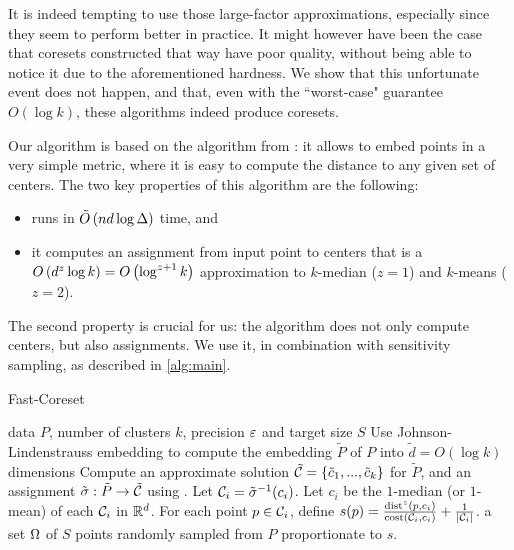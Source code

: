 It is indeed tempting to use those large-factor approximations, especially since they seem to perform better in practice. 
It might however have been the case that coresets constructed that way have poor quality, without being able to notice it due to the aforementioned hardness. 
We show that this unfortunate event does not happen, and that, even with the ``worst-case" guarantee $O(\log k)$, these algorithms indeed produce coresets.

Our algorithm is based on the \fkmeans algorithm from \cite{cohen2020fast}: it allows to embed points in a very simple metric,  where it is easy to compute the
distance to any given set of centers. The two key properties of this algorithm are the following: 
\begin{itemize}
\item \fkmeans runs in $\tilde O\left( n d \log \Delta\right)$ time, and
\item it computes an assignment from input point to centers that is a $O\left( d^z \log k\right) = O\left(\log^{z+1} k\right)$ approximation to $k$-median ($z=1$) and
$k$-means ($z=2$).
\end{itemize}

The second property is crucial for us: the algorithm does not only compute centers, but also assignments. 
  We use it, in combination with sensitivity sampling, as described in \cref{alg:main}.


\begin{algorithm}[tb]
   \caption{Fast-Coreset}
   \label{alg:main}
\begin{algorithmic}
    data $P$, number of clusters $k$, precision $\varepsilon$ and target size $S$
   \STATE Use Johnson-Lindenstrauss embedding to compute the embedding $\tilde P$ of $P$ into $\tilde d = O(\log k)$ dimensions
   \STATE Compute an approximate solution $\tilde {\mathcal C} = \left\{ \tilde c_1, ..., \tilde c_k\right\} $ for $\tilde P$, and an assignment $\tilde \sigma : \tilde P \rightarrow \tilde {\mathcal C}$ using \fkmeans.	
   \STATE Let $\mathcal C_i = \tilde \sigma^{-1}(c_i)$.
   \STATE Let $c_i$ be the $1$-median (or $1$-mean) of each $\mathcal C_i$ in $\mathbb{R}^d$.%
   \STATE For each point $p \in \mathcal C_i$, define
   $s(p) = \frac{\operatorname{dist}^z(p, c_i)}{\operatorname{cost}(\mathcal C_i, c_i)}+ \frac{1}{|\mathcal C_i|}$.
    a set $\Omega$ of $S$ points randomly sampled from $P$ proportionate to $s$.
\end{algorithmic}
\end{algorithm}



